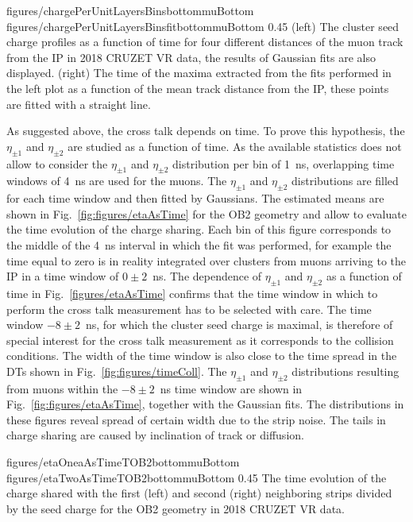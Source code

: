                  {figures/chargePerUnitLayersBinsbottommuBottom}
                 {figures/chargePerUnitLayersBinsfitbottommuBottom}
                 {0.45}       %
                 {(left) The cluster seed charge profiles as a function of time for four different distances of the muon track from the IP in 2018 CRUZET VR data, the results of Gaussian fits are also displayed. (right) The time of the maxima extracted from the fits performed in the left plot as a function of the mean track distance from the IP, these points are fitted with a straight line. }

As suggested above, the cross talk depends on time. To prove this hypothesis, the $\eta_{\pm 1}$ and $\eta_{\pm 2}$ are studied as a function of time. As the available statistics does not allow to consider the $\eta_{\pm 1}$ and $\eta_{\pm 2}$ distribution per bin of 1~ns, overlapping time windows of 4~ns are used for the muons. The $\eta_{\pm 1}$ and $\eta_{\pm 2}$ distributions are filled for each time window and then fitted by Gaussians. The estimated means are shown in Fig.~\ref{fig:figures/etaAsTime}  for the OB2 geometry and allow to evaluate the time evolution of the charge sharing. Each bin of this figure corresponds to the middle of the 4~ns interval in which the fit was performed, for example the time equal to zero is in reality integrated over clusters from muons arriving to the IP in a time window of $0 \pm 2$~ns. The dependence of $\eta_{\pm 1}$ and $\eta_{\pm 2}$ as a function of time in Fig.~\ref{figures/etaAsTime} confirms that the time window in which to perform the cross talk measurement has to be selected with care. The time window $-8 \pm 2$~ns, for which the cluster seed charge is maximal, is therefore of special interest for the cross talk measurement as it corresponds to the collision conditions. The width of the time window is also close to the time spread in the DTs shown in Fig.~\ref{fig:figures/timeColl}. The $\eta_{\pm 1}$ and $\eta_{\pm 2}$ distributions resulting from muons within the $-8 \pm 2$~ns time window are shown in Fig.~\ref{fig:figures/etaAsTime}, together with the Gaussian fits. The distributions in these figures reveal spread of certain width due to the strip noise. The tails in charge sharing are caused by inclination of track or diffusion.


                 {figures/etaOneaAsTimeTOB2bottommuBottom}
                 {figures/etaTwoAsTimeTOB2bottommuBottom} %
                 {0.45}       %
                 { The time evolution of the charge shared with the first (left) and second (right) neighboring strips divided by the seed charge for the OB2 geometry in 2018 CRUZET VR data.}

